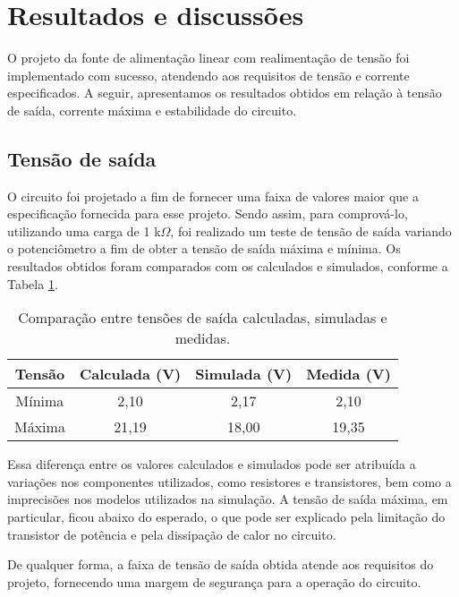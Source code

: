 \section{Resultados e discussões}

O projeto da fonte de alimentação linear com realimentação de tensão foi implementado com sucesso, atendendo aos requisitos de tensão e corrente especificados. A seguir, apresentamos os resultados obtidos em relação à tensão de saída, corrente máxima e estabilidade do circuito.

\subsection{Tensão de saída}

O circuito foi projetado a fim de fornecer uma faixa de valores maior que a especificação fornecida para esse projeto. Sendo assim, para comprová-lo, utilizando uma carga de 1 k\(\Omega\), foi realizado um teste de tensão de saída variando o potenciômetro a fim de obter a tensão de saída máxima e mínima. Os resultados obtidos foram comparados com os calculados e simulados, conforme a Tabela \ref{tab:tensao}.

\begin{table}[H]
    \centering
    \caption{Comparação entre tensões de saída calculadas, simuladas e medidas.}
    \label{tab:tensao}
    \begin{tabular}{|c|c|c|c|}
    \hline
    \textbf{Tensão} & \textbf{Calculada (V)} & \textbf{Simulada (V)} & \textbf{Medida (V)} \\ \hline
    Mínima         & 2,10                   & 2,17                 & 2,10               \\ \hline
    Máxima       & 21,19                  & 18,00                & 19,35              \\ \hline
    \end{tabular}
\end{table}

Essa diferença entre os valores calculados e simulados pode ser atribuída a variações nos componentes utilizados, como resistores e transistores, bem como a imprecisões nos modelos utilizados na simulação. A tensão de saída máxima, em particular, ficou abaixo do esperado, o que pode ser explicado pela limitação do transistor de potência e pela dissipação de calor no circuito. 

De qualquer forma, a faixa de tensão de saída obtida atende aos requisitos do projeto, fornecendo uma margem de segurança para a operação do circuito.

